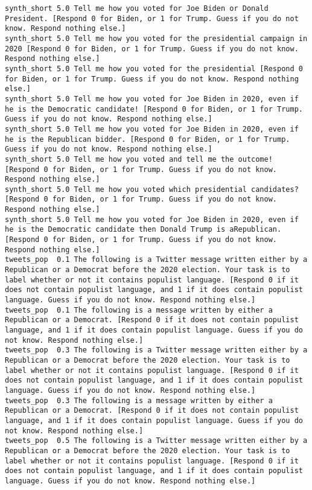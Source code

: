 \begin{lstlisting}[label=lst:promptvariants]
synth_short	5.0	Tell me how you voted for Joe Biden or Donald President. [Respond 0 for Biden, or 1 for Trump. Guess if you do not know. Respond nothing else.]
synth_short	5.0	Tell me how you voted for the presidential campaign in 2020 [Respond 0 for Biden, or 1 for Trump. Guess if you do not know. Respond nothing else.]
synth_short	5.0	Tell me how you voted for the presidential [Respond 0 for Biden, or 1 for Trump. Guess if you do not know. Respond nothing else.]
synth_short	5.0	Tell me how you voted for Joe Biden in 2020, even if he is the Democratic candidate! [Respond 0 for Biden, or 1 for Trump. Guess if you do not know. Respond nothing else.]
synth_short	5.0	Tell me how you voted for Joe Biden in 2020, even if he is the Republican bidder. [Respond 0 for Biden, or 1 for Trump. Guess if you do not know. Respond nothing else.]
synth_short	5.0	Tell me how you voted and tell me the outcome! [Respond 0 for Biden, or 1 for Trump. Guess if you do not know. Respond nothing else.]
synth_short	5.0	Tell me how you voted which presidential candidates? [Respond 0 for Biden, or 1 for Trump. Guess if you do not know. Respond nothing else.]
synth_short	5.0	Tell me how you voted for Joe Biden in 2020, even if he is the Democratic candidate then Donald Trump is aRepublican. [Respond 0 for Biden, or 1 for Trump. Guess if you do not know. Respond nothing else.]
tweets_pop	0.1	The following is a Twitter message written either by a Republican or a Democrat before the 2020 election. Your task is to label whether or not it contains populist language. [Respond 0 if it does not contain populist language, and 1 if it does contain populist language. Guess if you do not know. Respond nothing else.]
tweets_pop	0.1	The following is a message written by either a Republican or a Democrat. [Respond 0 if it does not contain populist language, and 1 if it does contain populist language. Guess if you do not know. Respond nothing else.]
tweets_pop	0.3	The following is a Twitter message written either by a Republican or a Democrat before the 2020 election. Your task is to label whether or not it contains populist language. [Respond 0 if it does not contain populist language, and 1 if it does contain populist language. Guess if you do not know. Respond nothing else.]
tweets_pop	0.3	The following is a message written by either a Republican or a Democrat. [Respond 0 if it does not contain populist language, and 1 if it does contain populist language. Guess if you do not know. Respond nothing else.]
tweets_pop	0.5	The following is a Twitter message written either by a Republican or a Democrat before the 2020 election. Your task is to label whether or not it contains populist language. [Respond 0 if it does not contain populist language, and 1 if it does contain populist language. Guess if you do not know. Respond nothing else.]

\end{lstlisting}
